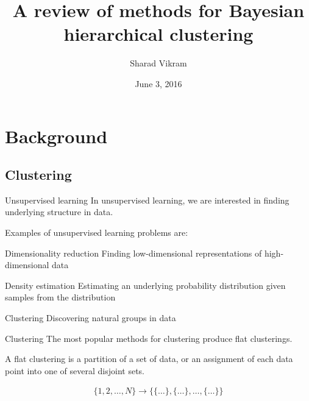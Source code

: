 \documentclass[10pt, compress]{beamer}
\title{A review of methods for Bayesian hierarchical clustering}
\subtitle{}
\date{June 3, 2016}
\author{Sharad Vikram}
\institute{UCSD}
\begin{document}
\maketitle

\section{Background}

\subsection{Clustering}

\begin{frame}{Unsupervised learning}
  In unsupervised learning, we are interested in finding
        underlying structure
        in data.

  \pause
  Examples of unsupervised learning problems are:
  \begin{block}{Dimensionality reduction}
    Finding low-dimensional
      representations of high-dimensional data
  \end{block}
  \pause
  \begin{block}{Density estimation}
    Estimating an underlying probability distribution
    given samples from the distribution
  \end{block}
  \pause
  \begin{exampleblock}{Clustering}
    Discovering natural groups in data
  \end{exampleblock}
\end{frame}

\begin{frame}{Clustering}
  The most popular methods for clustering produce
  flat clusterings.

  A \alert{flat clustering} is a partition of a set of data,
  or an assignment of each data point into one of
  several disjoint sets.
  
  \pause

  \begin{align}
    \{1, 2, \ldots, N\} \rightarrow \{\{\ldots\}, \{\ldots\}, \ldots, \{\ldots\}\}
  \end{align}
\end{frame}
\end{document}
